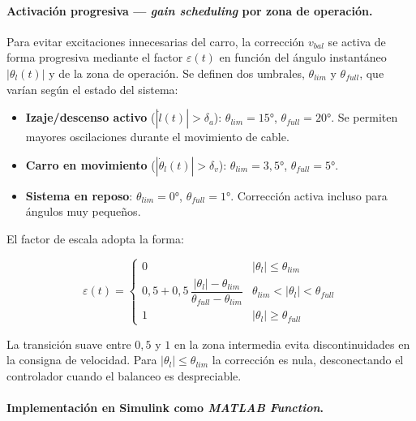 \documentclass[12pt, a4paper]{article}
\begin{document}
\paragraph{Activación progresiva — \textit{gain scheduling} por zona de operación.}

Para evitar excitaciones innecesarias del carro, la corrección $v_{bal}$ se activa de
forma progresiva mediante el factor $\varepsilon(t)$ en función del ángulo instantáneo
$|\theta_l(t)|$ y de la zona de operación. Se definen dos umbrales,
$\theta_{lim}$ y $\theta_{full}$, que varían según el estado del sistema:

\begin{itemize}
    \item \textbf{Izaje/descenso activo} ($|\dot{l}(t)|>\delta_a$):
          $\theta_{lim}=15°$, $\theta_{full}=20°$. Se permiten mayores oscilaciones
          durante el movimiento de cable.
    \item \textbf{Carro en movimiento} ($|\dot{\theta}_l(t)|>\delta_v$):
          $\theta_{lim}=3{,}5°$, $\theta_{full}=5°$.
    \item \textbf{Sistema en reposo}: $\theta_{lim}=0°$, $\theta_{full}=1°$.
          Corrección activa incluso para ángulos muy pequeños.
\end{itemize}

El factor de escala adopta la forma:

\begin{equation}
    \label{eq:escala}
    \varepsilon(t) =
    \begin{cases}
        0 & |\theta_l| \leq \theta_{lim} \\[4pt]
        0{,}5 + 0{,}5\,\dfrac{|\theta_l|-\theta_{lim}}{\theta_{full}-\theta_{lim}}
          & \theta_{lim} < |\theta_l| < \theta_{full} \\[4pt]
        1 & |\theta_l| \geq \theta_{full}
    \end{cases}
\end{equation}

La transición suave entre $0{,}5$ y $1$ en la zona intermedia evita discontinuidades en
la consigna de velocidad. Para $|\theta_l|\leq\theta_{lim}$ la corrección es nula,
desconectando el controlador cuando el balanceo es despreciable.

\paragraph{Implementación en Simulink como \textit{MATLAB Function}.}
\end{document}
